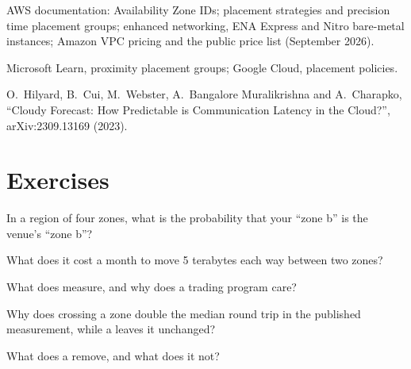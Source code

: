 \begin{omsources}
\item AWS documentation: Availability Zone IDs; placement strategies and precision time placement groups; enhanced networking, ENA Express and
Nitro bare-metal instances; Amazon VPC pricing and the public price list (September 2026).
\item Microsoft Learn, proximity placement groups; Google Cloud, placement policies.
\item O.~Hilyard, B.~Cui, M.~Webster, A.~Bangalore Muralikrishna and A.~Charapko, ``Cloudy Forecast: How Predictable is Communication Latency in the
Cloud?'', arXiv:2309.13169 (2023).
\end{omsources}

\section{Exercises}

\begin{exercise}[$\star$]\label{exo:nw:trading-in-a-public-cloud:1}
In a region of four zones, what is the probability that your ``zone b'' is the venue's ``zone b''?
\end{exercise}

\begin{exercise}[$\star$]\label{exo:nw:trading-in-a-public-cloud:2}
What does it cost a month to move 5 terabytes each way between two zones?
\end{exercise}

\begin{exercise}[$\star$]\label{exo:nw:trading-in-a-public-cloud:3}
What does  measure, and why does a trading program care?
\end{exercise}

\begin{exercise}[$\star\star$]\label{exo:nw:trading-in-a-public-cloud:4}
Why does crossing a zone double the median round trip in the published measurement, while a  leaves it unchanged?
\end{exercise}

\begin{exercise}[$\star\star$]\label{exo:nw:trading-in-a-public-cloud:5}
What does a  remove, and what does it not?
\end{exercise}

